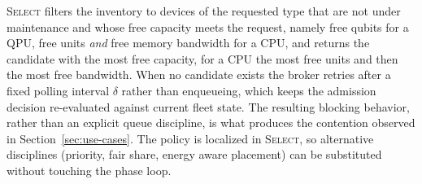 \textsc{Select} filters the inventory to devices of the requested type that are not under maintenance and whose free capacity meets the request, namely free qubits for a QPU, free units \emph{and} free memory bandwidth for a CPU, and returns the candidate with the most free capacity, for a CPU the most free units and then the most free bandwidth. When no candidate exists the broker retries after a fixed polling interval $\delta$ rather than enqueueing, which keeps the admission decision re-evaluated against current fleet state. The resulting blocking behavior, rather than an explicit queue discipline, is what produces the contention observed in Section~\ref{sec:use-cases}. The policy is localized in \textsc{Select}, so alternative disciplines (priority, fair share, energy aware placement) can be substituted without touching the phase loop.
